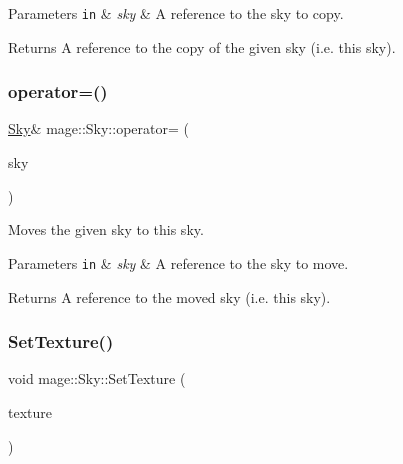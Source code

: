 \begin{DoxyParams}[1]{Parameters}
\mbox{\tt in}  & {\em sky} & A reference to the sky to copy. \\
\hline
\end{DoxyParams}
\begin{DoxyReturn}{Returns}
A reference to the copy of the given sky (i.\+e. this sky). 
\end{DoxyReturn}
\hypertarget{classmage_1_1_sky_a07e7ad68f471344d06357ea68b82ef84}{}\label{classmage_1_1_sky_a07e7ad68f471344d06357ea68b82ef84} 
\subsubsection{\texorpdfstring{operator=()}{operator=()}\hspace{0.1cm}{\footnotesize\ttfamily [2/2]}}
{\footnotesize\ttfamily \hyperlink{classmage_1_1_sky}{Sky}\& mage\+::\+Sky\+::operator= (\begin{DoxyParamCaption}\item[{\hyperlink{classmage_1_1_sky}{Sky} \&\&}]{sky }\end{DoxyParamCaption})\hspace{0.3cm}{\ttfamily [delete]}}

Moves the given sky to this sky.


\begin{DoxyParams}[1]{Parameters}
\mbox{\tt in}  & {\em sky} & A reference to the sky to move. \\
\hline
\end{DoxyParams}
\begin{DoxyReturn}{Returns}
A reference to the moved sky (i.\+e. this sky). 
\end{DoxyReturn}
\hypertarget{classmage_1_1_sky_aceb336c88ac33bb8490987812414578c}{}\label{classmage_1_1_sky_aceb336c88ac33bb8490987812414578c} 
\subsubsection{\texorpdfstring{Set\+Texture()}{SetTexture()}}
{\footnotesize\ttfamily void mage\+::\+Sky\+::\+Set\+Texture (\begin{DoxyParamCaption}\item[{const \hyperlink{namespacemage_a1e01ae66713838a7a67d30e44c67703e}{Shared\+Ptr}$<$ const \hyperlink{classmage_1_1_texture}{Texture} $>$ \&}]{texture }\end{DoxyParamCaption})}

